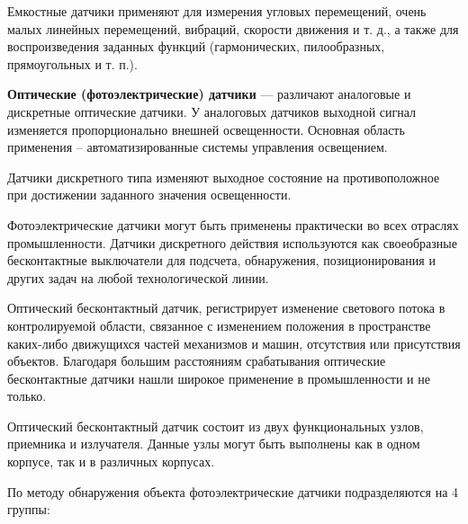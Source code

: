 Емкостные датчики применяют для измерения угловых перемещений, очень малых линейных перемещений, вибраций, скорости движения и т. д., а также для воспроизведения заданных функций (гармонических, пилообразных, прямоугольных и т. п.).


\textbf{Оптические (фотоэлектрические) датчики} --- различают аналоговые и дискретные оптические датчики. У аналоговых датчиков выходной сигнал изменяется пропорционально внешней освещенности. Основная область применения – автоматизированные системы управления освещением.

Датчики дискретного типа изменяют выходное состояние на противоположное при достижении заданного значения освещенности. 

Фотоэлектрические датчики могут быть применены практически во всех отраслях промышленности. Датчики дискретного действия используются как своеобразные бесконтактные выключатели для подсчета, обнаружения, позиционирования и других задач на любой технологической линии.

Оптический бесконтактный датчик, регистрирует изменение светового потока в контролируемой области, связанное с изменением положения в пространстве каких-либо движущихся частей механизмов и машин, отсутствия или присутствия объектов. Благодаря большим расстояниям срабатывания оптические бесконтактные датчики нашли широкое применение в промышленности и не только.

Оптический бесконтактный датчик состоит из двух функциональных узлов, приемника и излучателя. Данные узлы могут быть выполнены как в одном корпусе, так и в различных корпусах. 

По методу обнаружения объекта фотоэлектрические датчики подразделяются на 4 группы:

